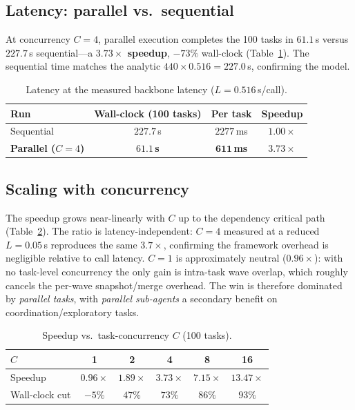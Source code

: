 \documentclass[10pt,twocolumn]{article}
\begin{document}
\subsection{Latency: parallel vs.\ sequential}
At concurrency $C{=}4$, parallel execution completes the 100 tasks in $61.1$\,s
versus $227.7$\,s sequential---a \textbf{$3.73\times$ speedup}, $-73\%$ wall-clock
(Table~\ref{tab:lat}). The sequential time matches the analytic
$440{\times}0.516{=}227.0$\,s, confirming the model.

\begin{table}[t]
\centering\small
\begin{tabular}{@{}lccc@{}}
\toprule
Run & Wall-clock (100 tasks) & Per task & Speedup\\
\midrule
Sequential       & $227.7$\,s & $2277$\,ms & $1.00\times$\\
\textbf{Parallel ($C{=}4$)} & $\mathbf{61.1}$\,\textbf{s} & $\mathbf{611}$\,\textbf{ms} & $\mathbf{3.73\times}$\\
\bottomrule
\end{tabular}
\caption{Latency at the measured backbone latency ($L{=}0.516$\,s/call).}
\label{tab:lat}
\end{table}

\subsection{Scaling with concurrency}
The speedup grows near-linearly with $C$ up to the dependency critical path
(Table~\ref{tab:scale}). The ratio is latency-independent: $C{=}4$ measured at a
reduced $L{=}0.05$\,s reproduces the same $3.7\times$, confirming the framework
overhead is negligible relative to call latency. $C{=}1$ is approximately neutral
($0.96\times$): with no task-level concurrency the only gain is intra-task wave
overlap, which roughly cancels the per-wave snapshot/merge overhead. The win is
therefore dominated by \emph{parallel tasks}, with \emph{parallel sub-agents} a
secondary benefit on coordination/exploratory tasks.

\begin{table}[t]
\centering\small
\begin{tabular}{@{}lccccc@{}}
\toprule
$C$ & 1 & 2 & 4 & 8 & 16\\
\midrule
Speedup        & $0.96\times$ & $1.89\times$ & $3.73\times$ & $7.15\times$ & $13.47\times$\\
Wall-clock cut & $-5\%$ & $47\%$ & $73\%$ & $86\%$ & $93\%$\\
\bottomrule
\end{tabular}
\caption{Speedup vs.\ task-concurrency $C$ (100 tasks).}
\label{tab:scale}
\end{table}
\end{document}
